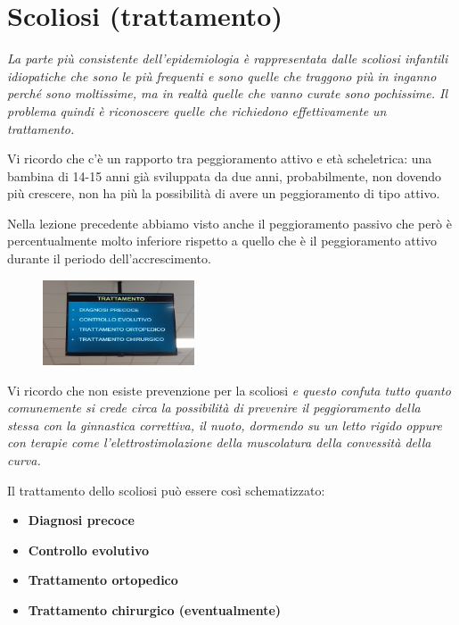 \section{Scoliosi (trattamento)}

\emph{La parte più consistente dell'epidemiologia è rappresentata dalle scoliosi infantili idiopatiche che sono le più frequenti e sono quelle che traggono più in inganno perché sono moltissime, ma in realtà quelle che vanno curate sono pochissime. Il problema quindi è riconoscere quelle che richiedono effettivamente un trattamento.}

Vi ricordo che c'è un rapporto tra peggioramento attivo e età scheletrica: una bambina di 14-15 anni già sviluppata da due anni, probabilmente, non dovendo più crescere, non ha più la possibilità di
avere un peggioramento di tipo attivo.

Nella lezione precedente abbiamo visto anche il peggioramento passivo che però è percentualmente molto inferiore rispetto a quello che è il peggioramento attivo durante il periodo dell'accrescimento.

\begin{figure}[!ht]
\centering
\includegraphics[width=0.4\textwidth]{013/image1.jpeg}
\end{figure}

Vi ricordo che non esiste prevenzione per la scoliosi \emph{e questo confuta tutto quanto comunemente si crede circa la possibilità di prevenire il peggioramento della stessa con la ginnastica correttiva, il nuoto, dormendo su un letto rigido oppure con terapie come l'elettrostimolazione della muscolatura della convessità della curva.}

Il trattamento dello scoliosi può essere così schematizzato:

\begin{itemize}
\item
  \textbf{Diagnosi precoce}
\item
  \textbf{Controllo evolutivo}
\item
  \textbf{Trattamento ortopedico}
\item
  \textbf{Trattamento chirurgico (eventualmente)}
\end{itemize}

